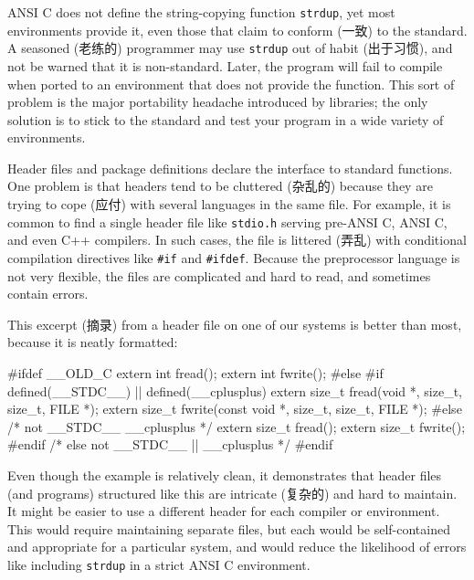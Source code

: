 ANSI C does not define the string-copying function \verb'strdup', yet most
environments provide it, even those that claim to conform (一致) to the
standard. A seasoned (老练的) programmer may use \verb'strdup' out of habit
(出于习惯), and not be warned that it is non-standard.  Later, the program
will fail to compile when ported to an environment that does not provide
the function. This sort of problem is the major portability headache
introduced by libraries; the only solution is to stick to the standard and
test your program in a wide variety of environments.

Header files and package definitions declare the interface to standard
functions.  One problem is that headers tend to be cluttered (杂乱的)
because they are trying to cope (应付) with several languages in the same
file. For example, it is common to find a single header file like
\verb'stdio.h' serving pre-ANSI C, ANSI C, and even C++ compilers. In such
cases, the file is littered (弄乱) with conditional compilation directives
like \verb'#if' and \verb'#ifdef'.  Because the preprocessor language is
not very flexible, the files are complicated and hard to read, and
sometimes contain errors.

This excerpt (摘录) from a header file on one of our systems is better than
most, because it is neatly formatted:
\begin{wellcode}
    #ifdef __OLD_C
        extern int fread();
        extern int fwrite();
    #else
        #if defined(__STDC__) || defined(__cplusplus)
            extern size_t fread(void *, size_t, size_t, FILE *);
            extern size_t fwrite(const void *, size_t, size_t, FILE *);
        #else /* not __STDC__ __cplusplus */
            extern size_t fread();
            extern size_t fwrite();
        #endif /* else not __STDC__ || __cplusplus */
    #endif
\end{wellcode}
Even though the example is relatively clean, it demonstrates that header
files (and programs) structured like this are intricate (复杂的) and hard
to maintain. It might be easier to use a different header for each compiler
or environment. This would require maintaining separate files, but each
would be self-contained and appropriate for a particular system, and would
reduce the likelihood of errors like including \verb'strdup' in a strict
ANSI C environment.

